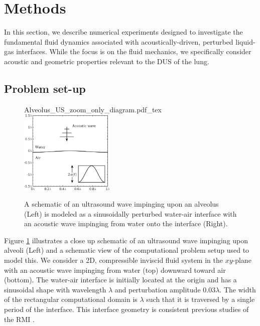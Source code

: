 \section{Methods} \label{sec:methods}%
In this section, we describe numerical experiments designed to
investigate the fundamental fluid dynamics associated with
acoustically-driven, perturbed liquid-gas interfaces. While the focus
is on the fluid mechanics, we specifically consider acoustic and
geometric properties relevant to the \ac{DUS} of the lung.

\subsection{Problem set-up}
\label{subsec:setup}
\begin{figure}[h]
  \centering
  \def\svgwidth{0.48\textwidth}
   {Alveolus_US_zoom_only_diagram.pdf_tex} \hfill%
   \includegraphics[width=0.4\textwidth]{./figs/lung_figs/usbe_model_schematic2} \hfill
   \caption[A schematic view of the model problem]{A schematic of an
     ultrasound wave impinging upon an alveolus (Left) is modeled as a
     sinusoidally perturbed water-air interface with an acoustic wave
     impinging from water onto the interface (Right).}
  \label{fig:problem_schematic}
\end{figure}
% 
Figure \ref{fig:problem_schematic} illustrates a close up schematic of
an ultrasound wave impinging upon alveoli (Left) and a schematic view
of the computational problem setup used to model this. We consider a
2D, compressible inviscid fluid system in the $xy$-plane with an
acoustic wave impinging from water (top) downward toward air
(bottom). The water-air interface is initially located at the origin
and has a sinusoidal shape with wavelength $\lambda$ and perturbation
amplitude $0.03\lambda$. The width of the rectangular computational
domain is $\lambda$ such that it is traversed by a single period of
the interface. This interface geometry is consistent previous studies
of the \ac{RMI} \citep{Brouillette2002}.

